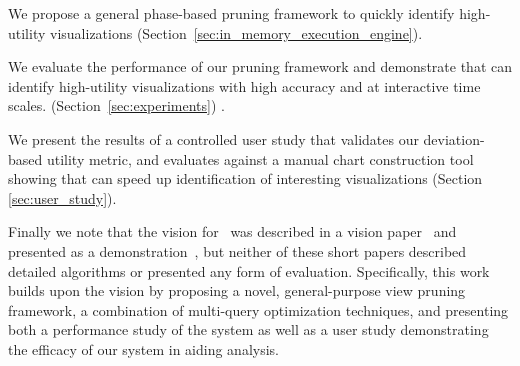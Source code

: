 \begin{denselist}
  \item We propose a general phase-based pruning framework to quickly identify
  high-utility visualizations (Section~\ref{sec:in_memory_execution_engine}).
  \item We evaluate the performance of our pruning framework and demonstrate that \SeeDB
  can identify high-utility visualizations with high accuracy and at interactive time scales.
  (Section~\ref{sec:experiments}) . 
  \item We present the results of a controlled user study that validates our deviation-based 
  utility metric, and evaluates \SeeDB against a manual chart construction tool 
  showing that \SeeDB can speed up identification of interesting 
  visualizations (Section \ref{sec:user_study}).
\end{denselist}

\noindent Finally we note that the vision for \SeeDB\ was described in a vision paper~\cite{DBLP:conf/vldb/Parameswaran2013} and presented as a demonstration~\cite{DBLP:journals/pvldb/VartakMPP14}, but neither of these short papers described detailed algorithms or
presented any form of evaluation.
 Specifically, this work builds upon the \SeeDB vision by proposing a novel, general-purpose view 
pruning framework, a combination of multi-query optimization techniques, and presenting 
both a performance study of the system as well as a user study demonstrating the efficacy of our system in aiding analysis.


